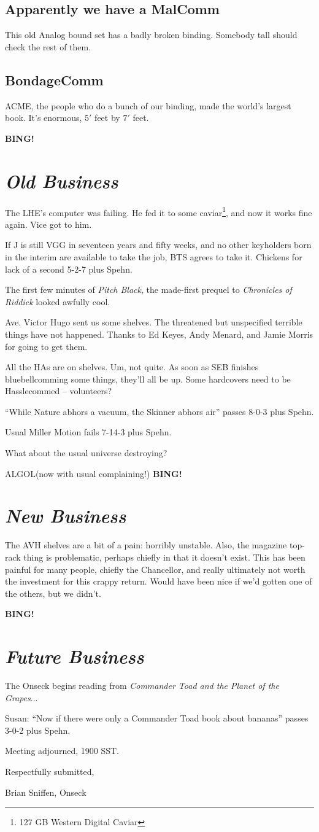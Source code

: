 \documentclass[10pt]{article}
\newcommand{\bing}{{\bf BING!} }
\newcommand{\goto}[1]{\bing \vskip 12pt \section*{{\em{#1}}}}
\newcommand{\ps}{ plus Spehn\xspace}
\begin{document}
\subsection*{Apparently we have a MalComm}
This old Analog bound set has a badly broken binding.  Somebody tall
should check the rest of them.

\subsection*{BondageComm}
ACME, the people who do a bunch of our binding, made the world's
largest book.  It's enormous, $5'$ feet by $7'$ feet.

\goto{Old Business}

The LHE's computer was failing.  He fed it to some caviar\footnote{127
  GB Western Digital Caviar}, and now it works fine again.  Vice got
to him.

If J is still VGG in seventeen years and fifty weeks, and no other
keyholders born in the interim are available to take the job, BTS
agrees to take it.  Chickens for lack of a second 5-2-7\ps.

The first few minutes of \emph{Pitch Black}, the made-first prequel to
\emph{Chronicles of Riddick} looked awfully cool.

Ave. Victor Hugo sent us some shelves.  The threatened but unspecified
terrible things have not happened.  Thanks to Ed Keyes, Andy Menard,
and Jamie Morris for going to get them.

All the HAs are on shelves.  Um, not quite.  As soon as SEB finishes
bluebellcomming some things, they'll all be up.  Some hardcovers need
to be Hasslecommed -- volunteers? 

``While Nature abhors a vacuum, the Skinner abhors air'' passes 8-0-3\ps.

Usual Miller Motion fails 7-14-3\ps.

What about the usual universe destroying?

ALGOL(now with usual complaining!)
\goto{New Business}

The AVH shelves are a bit of a pain: horribly unstable.  Also, the
magazine top-rack thing is problematic, perhaps chiefly in that it
doesn't exist.  This has been painful for many people, chiefly the
Chancellor, and really ultimately not worth the investment for this
crappy return.  Would have been nice if we'd gotten one of the others,
but we didn't.

\goto{Future Business}

The Onseck begins reading from \emph{Commander Toad and the Planet of
  the Grapes}...

Susan: ``Now if there were only a Commander Toad book about bananas''
passes 3-0-2\ps.

\vspace{12pt}

\noindent
Meeting adjourned, 1900 SST.

\vspace{18pt}

\centerline{Respectfully submitted,}
\centerline{Brian Sniffen, Onseck}
\end{document}
